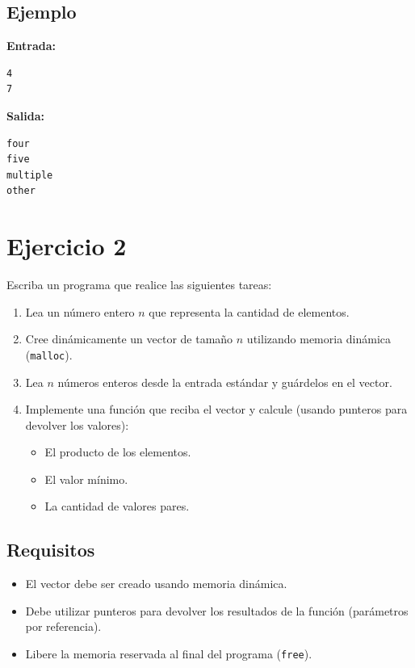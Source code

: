 \documentclass[12pt,a4paper]{article}
\begin{document}
\subsection*{Ejemplo}
\textbf{Entrada:}
\begin{lstlisting}[numbers=none]
4
7
\end{lstlisting}

\textbf{Salida:}
\begin{lstlisting}[numbers=none]
four
five
multiple
other
\end{lstlisting}

\newpage

\section*{Ejercicio 2}

Escriba un programa que realice las siguientes tareas:
\begin{enumerate}
    \item Lea un número entero $n$ que representa la cantidad de elementos.
    \item Cree dinámicamente un vector de tamaño $n$ utilizando memoria dinámica (\texttt{malloc}).
    \item Lea $n$ números enteros desde la entrada estándar y guárdelos en el vector.
    \item Implemente una función que reciba el vector y calcule (usando punteros para devolver los valores):
    \begin{itemize}
        \item El producto de los elementos.
        \item El valor mínimo.
        \item La cantidad de valores pares.
    \end{itemize}
\end{enumerate}

\subsection*{Requisitos}
\begin{itemize}
    \item El vector debe ser creado usando memoria dinámica.
    \item Debe utilizar punteros para devolver los resultados de la función (parámetros por referencia).
    \item Libere la memoria reservada al final del programa (\texttt{free}).
\end{itemize}
\end{document}
